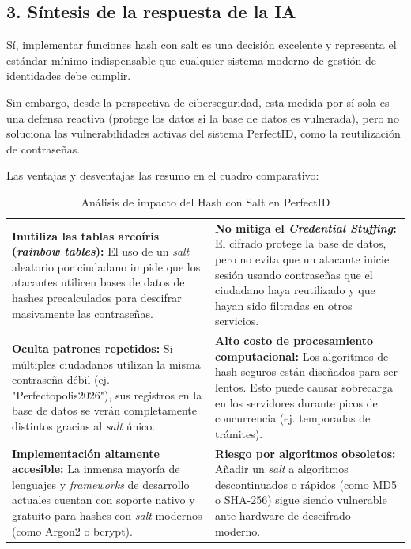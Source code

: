 \subsection*{3. Síntesis de la respuesta de la IA}
Sí, implementar funciones hash con salt es una decisión excelente y representa el estándar mínimo indispensable que cualquier sistema moderno de gestión de identidades debe cumplir.

Sin embargo, desde la perspectiva de ciberseguridad, esta medida por sí sola es una defensa reactiva (protege los datos si la base de datos es vulnerada), pero no soluciona las vulnerabilidades activas del sistema PerfectID, como la reutilización de contraseñas.

Las ventajas y desventajas las resumo en el cuadro comparativo: 
\begin{table}[h]
\centering
\renewcommand{\arraystretch}{1.8}
\begin{tabularx}{\textwidth}{|>{\raggedright\arraybackslash}X|>{\raggedright\arraybackslash}X|}
\hline
\multicolumn{1}{|c|}{\textbf{Ventajas}} & \multicolumn{1}{c|}{\textbf{Desventajas}} \\
\hline
\textbf{Inutiliza las tablas arcoíris (\textit{rainbow tables}):} El uso de un \textit{salt} aleatorio por ciudadano impide que los atacantes utilicen bases de datos de hashes precalculados para descifrar masivamente las contraseñas. & \textbf{No mitiga el \textit{Credential Stuffing}:} El cifrado protege la base de datos, pero no evita que un atacante inicie sesión usando contraseñas que el ciudadano haya reutilizado y que hayan sido filtradas en otros servicios. \\
\hline
\textbf{Oculta patrones repetidos:} Si múltiples ciudadanos utilizan la misma contraseña débil (ej. "Perfectopolis2026"), sus registros en la base de datos se verán completamente distintos gracias al \textit{salt} único. & \textbf{Alto costo de procesamiento computacional:} Los algoritmos de hash seguros están diseñados para ser lentos. Esto puede causar sobrecarga en los servidores durante picos de concurrencia (ej. temporadas de trámites). \\
\hline
\textbf{Implementación altamente accesible:} La inmensa mayoría de lenguajes y \textit{frameworks} de desarrollo actuales cuentan con soporte nativo y gratuito para hashes con \textit{salt} modernos (como Argon2 o bcrypt). & \textbf{Riesgo por algoritmos obsoletos:} Añadir un \textit{salt} a algoritmos descontinuados o rápidos (como MD5 o SHA-256) sigue siendo vulnerable ante hardware de descifrado moderno. \\
\hline
\end{tabularx}
\caption{Análisis de impacto del Hash con Salt en PerfectID}
\end{table}
